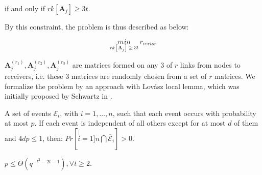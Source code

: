 if and only if $rk\left[\boldsymbol{A}_{j}\right]\geq3t$.

By this constraint, the problem is thus described as below:

\[
\underset{rk\left[\boldsymbol{A}_{j}\right]\geq3t}{min}\,r_{vector}
\]

$\boldsymbol{A}_{j}^{\left(r_{1}\right)},\boldsymbol{A}_{j}^{\left(r_{2}\right)},\boldsymbol{A}_{j}^{\left(r_{3}\right)}$
are matrices formed on any 3 of $r$ links from nodes to receivers,
i.e. these 3 matrices are randomly chosen from a set of $r$ matrices.
We formalize the problem by an approach with Lov\'asz local lemma,
which was initially proposed by Schwartz in \cite{MosheSchwartz:2018}.
\begin{lem}
 A set of events $\mathcal{E}_{i}$, with $i=1,\ldots,n$, such that
each event occurs with probability at most $p$. If each event is
independent of all others except for at most $d$ of them and $4dp\leq1$,
then: $Pr\left[\stackrel[i=1]{n}{\bigcap}\overline{\mathcal{E}}_{i}\right]>0$.
\label{thm:LLL}
\end{lem}
%
\begin{lem}
$p\leq\Theta\left(q^{-t^{2}-2t-1}\right),\forall t\geq2$. \label{lem:prob_p_LLL_formula}
\end{lem}
